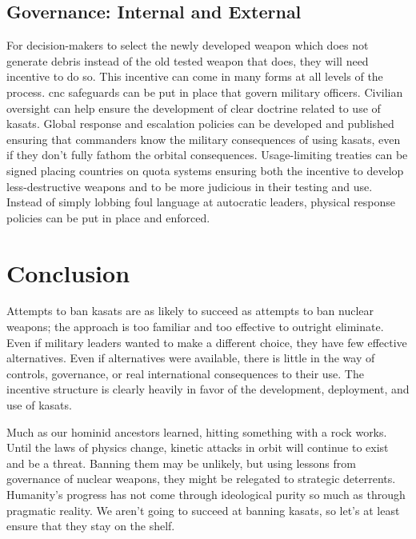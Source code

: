 \subsection*{Governance: Internal and External}
For decision-makers to select the newly developed weapon which does
not generate debris instead of the old tested weapon that does, they
will need incentive to do so.  This incentive can come in many forms
at all levels of the process. \ac{cnc} safeguards can be put in place
that govern military officers.  Civilian oversight can help ensure the
development of clear doctrine related to use of \acp{kasat}.  Global
response and escalation policies can be developed and published
ensuring that commanders know the military consequences of using
\acp{kasat}, even if they don't fully fathom the orbital consequences.
Usage-limiting treaties can be signed placing countries on quota
systems ensuring both the incentive to develop less-destructive
weapons and to be more judicious in their testing and use.  Instead of
simply lobbing foul language at autocratic leaders, physical response
policies can be put in place and enforced.

\section*{Conclusion}
Attempts to ban \acp{kasat} are as likely to succeed as attempts to
ban nuclear weapons; the approach is too familiar and too effective to
outright eliminate.  Even if military leaders wanted to make a
different choice, they have few effective alternatives.  Even if
alternatives were available, there is little in the way of controls,
governance, or real international consequences to their use.  The
incentive structure is clearly heavily in favor of the development,
deployment, and use of \acp{kasat}.

Much as our hominid ancestors learned, hitting something with a rock
works.  Until the laws of physics change, kinetic attacks in orbit
will continue to exist and be a threat.  Banning them may be unlikely,
but using lessons from governance of nuclear weapons, they might be
relegated to strategic deterrents.  Humanity's progress has not come
through ideological purity so much as through pragmatic reality.  We
aren't going to succeed at banning \aclp{kasat}, so let's at least
ensure that they stay on the shelf.
